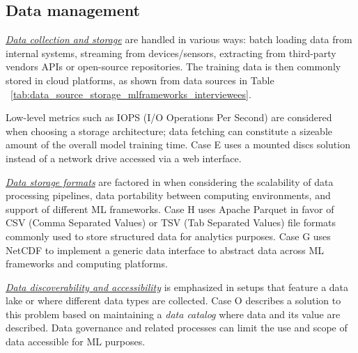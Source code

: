 


\subsection{Data management}

\underline{\emph{Data collection and storage}}
are handled in various ways: batch loading data from internal systems, streaming from devices/sensors, extracting from third-party vendors APIs or open-source repositories. The training data is then commonly stored in cloud platforms, as shown from data sources in Table ~\ref{tab:data_source_storage_mlframeworks_interviewees}.

Low-level metrics such as IOPS (I/O Operations Per Second) are considered when choosing a storage architecture; data fetching can constitute a sizeable amount of the overall model training time. Case E uses a mounted discs solution instead of a network drive accessed via a web interface. %

\underline{\emph{Data storage formats}} are factored in when considering the scalability of data processing pipelines, data portability between computing environments, and support of different ML frameworks. Case H uses Apache Parquet in favor of CSV (Comma Separated Values) or TSV (Tab Separated Values) file formats commonly used to store structured data for analytics purposes. Case G uses NetCDF to implement a generic data interface to abstract data across ML frameworks and computing platforms. 


\underline{\emph{Data discoverability and accessibility}}
is emphasized in setups that feature a data lake or where different data types are collected. Case O describes a solution to this problem based on maintaining a \textit{data catalog} where data and its value are described. %
Data governance and related processes can limit the use and scope of data accessible for ML purposes.

